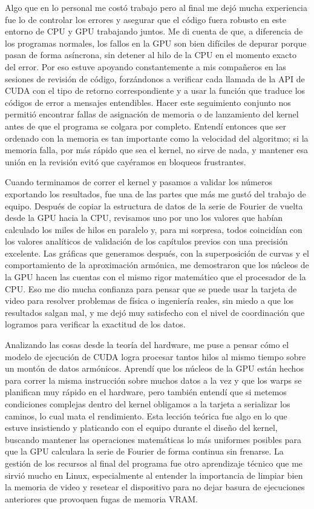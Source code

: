 Algo que en lo personal me costó trabajo pero al final me dejó mucha experiencia fue lo de controlar los errores y asegurar que el código fuera robusto en este entorno de CPU y GPU trabajando juntos. Me di cuenta de que, a diferencia de los programas normales, los fallos en la GPU son bien difíciles de depurar porque pasan de forma asíncrona, sin detener al hilo de la CPU en el momento exacto del error. Por eso estuve apoyando constantemente a mis compañeros en las sesiones de revisión de código, forzándonos a verificar cada llamada de la API de CUDA con el tipo de retorno correspondiente y a usar la función que traduce los códigos de error a mensajes entendibles. Hacer este seguimiento conjunto nos permitió encontrar fallas de asignación de memoria o de lanzamiento del kernel antes de que el programa se colgara por completo. Entendí entonces que ser ordenado con la memoria es tan importante como la velocidad del algoritmo; si la memoria falla, por más rápido que sea el kernel, no sirve de nada, y mantener esa unión en la revisión evitó que cayéramos en bloqueos frustrantes.

Cuando terminamos de correr el kernel y pasamos a validar los números exportando los resultados, fue una de las partes que más me gustó del trabajo de equipo. Después de copiar la estructura de datos de la serie de Fourier de vuelta desde la GPU hacia la CPU, revisamos uno por uno los valores que habían calculado los miles de hilos en paralelo y, para mi sorpresa, todos coincidían con los valores analíticos de validación de los capítulos previos con una precisión excelente. Las gráficas que generamos después, con la superposición de curvas y el comportamiento de la aproximación armónica, me demostraron que los núcleos de la GPU hacen las cuentas con el mismo rigor matemático que el procesador de la CPU. Eso me dio mucha confianza para pensar que se puede usar la tarjeta de video para resolver problemas de física o ingeniería reales, sin miedo a que los resultados salgan mal, y me dejó muy satisfecho con el nivel de coordinación que logramos para verificar la exactitud de los datos.

Analizando las cosas desde la teoría del hardware, me puse a pensar cómo el modelo de ejecución de CUDA logra procesar tantos hilos al mismo tiempo sobre un montón de datos armónicos. Aprendí que los núcleos de la GPU están hechos para correr la misma instrucción sobre muchos datos a la vez y que los warps se planifican muy rápido en el hardware, pero también entendí que si metemos condiciones complejas dentro del kernel obligamos a la tarjeta a serializar los caminos, lo cual mata el rendimiento. Esta lección teórica fue algo en lo que estuve insistiendo y platicando con el equipo durante el diseño del kernel, buscando mantener las operaciones matemáticas lo más uniformes posibles para que la GPU calculara la serie de Fourier de forma continua sin frenarse. La gestión de los recursos al final del programa fue otro aprendizaje técnico que me sirvió mucho en Linux, especialmente al entender la importancia de limpiar bien la memoria de video y resetear el dispositivo para no dejar basura de ejecuciones anteriores que provoquen fugas de memoria VRAM.

